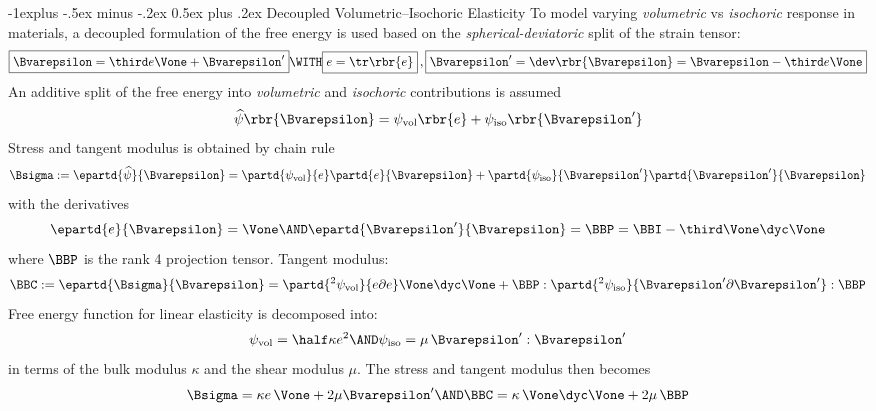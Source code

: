 \documentclass[10pt,landscape]{article}
\makeatletter
\def\Bveps{\Bvarepsilon}
\renewcommand{\subsection}{\@startsection{subsection}{2}{0mm}%
                                {-1explus -.5ex minus -.2ex}%
                                {0.5ex plus .2ex}%
                                {\normalfont\normalsize\bfseries}}
\makeatother
\begin{document}
\begin{multicols*}{3}
\subsection{Decoupled Volumetric--Isochoric Elasticity}
To model varying \emph{volumetric} vs \emph{isochoric} response in materials, a
decoupled formulation of the free energy is used based on the
\emph{spherical-deviatoric} split of the strain tensor:
\begin{equation}
  \boxed{\Bveps = \third e \Vone + \Bveps'}
  \WITH \boxed{e=\tr\rbr{e}}\, ,
  \boxed{\Bveps'=\dev\rbr{\Bveps} = \Bveps - \third e \Vone}
\end{equation}
An additive split of the free energy into \emph{volumetric} and \emph{isochoric}
contributions is assumed
\begin{equation}
  \widehat{\psi}\rbr{\Bveps}=\psi_\textup{vol}\rbr{e} + \psi_\textup{iso}\rbr{\Bveps'}
\end{equation}
Stress and tangent modulus is obtained by chain rule
\begin{equation}
  \Bsigma := \epartd{\widehat{\psi}}{\Bveps} =
  \partd{\psi_\textup{vol}}{e}\partd{e}{\Bveps}
  + \partd{\psi_\textup{iso}}{\Bveps'}\partd{\Bveps'}{\Bveps}
\end{equation}
with the derivatives
\begin{equation}
  \epartd{e}{\Bveps} = \Vone \AND \epartd{\Bveps'}{\Bveps} = \BBP = \BBI -\third\Vone\dyc\Vone
\end{equation}
where $\BBP$ is the rank 4 projection tensor. Tangent modulus:
\begin{equation}
  \BBC := \epartd{\Bsigma}{\Bveps}
  = \partd{^2\psi_\textup{vol}}{e\partial e} \Vone\dyc\Vone
  + \BBP : \partd{^2\psi_\textup{iso}}{\Bveps'\partial\Bveps'}:\BBP
\end{equation}
Free energy function for linear elasticity is decomposed into:
\begin{equation}
  \psi_\textup{vol}=\half\kappa e^2 \AND \psi_\textup{iso}=\mu\,\Bveps':\Bveps'
\end{equation}
in terms of the bulk modulus $\kappa$ and the shear modulus $\mu$. The stress
and tangent modulus then becomes
\begin{equation}
  \Bsigma=\kappa e\,\Vone+2\mu\Bveps' \AND \BBC=\kappa\,\Vone\dyc\Vone+2\mu\,\BBP
\end{equation}

\end{multicols*}
\end{document}
